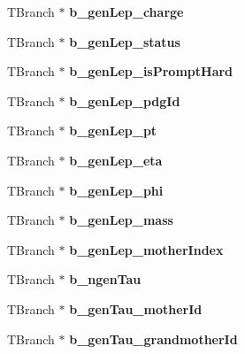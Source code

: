 \begin{DoxyCompactItemize}
T\+Branch $\ast$ {\bfseries b\+\_\+gen\+Lep\+\_\+charge}
\item 
\hypertarget{classMiniTree_a576df50212d621702f6d9ecfdaa6e6f2}{}\label{classMiniTree_a576df50212d621702f6d9ecfdaa6e6f2} 
T\+Branch $\ast$ {\bfseries b\+\_\+gen\+Lep\+\_\+status}
\item 
\hypertarget{classMiniTree_a61502a26cf655a8148547f975661ac36}{}\label{classMiniTree_a61502a26cf655a8148547f975661ac36} 
T\+Branch $\ast$ {\bfseries b\+\_\+gen\+Lep\+\_\+is\+Prompt\+Hard}
\item 
\hypertarget{classMiniTree_aebd575344b9b24a58ee00bd4f8bb2f8b}{}\label{classMiniTree_aebd575344b9b24a58ee00bd4f8bb2f8b} 
T\+Branch $\ast$ {\bfseries b\+\_\+gen\+Lep\+\_\+pdg\+Id}
\item 
\hypertarget{classMiniTree_a7c33791838941e782e6c7059634a1b1a}{}\label{classMiniTree_a7c33791838941e782e6c7059634a1b1a} 
T\+Branch $\ast$ {\bfseries b\+\_\+gen\+Lep\+\_\+pt}
\item 
\hypertarget{classMiniTree_a9fbb54404c9680bcb071a15d5f2c19b6}{}\label{classMiniTree_a9fbb54404c9680bcb071a15d5f2c19b6} 
T\+Branch $\ast$ {\bfseries b\+\_\+gen\+Lep\+\_\+eta}
\item 
\hypertarget{classMiniTree_a4b96f70b2d96fdfb5286c4ee5aa53738}{}\label{classMiniTree_a4b96f70b2d96fdfb5286c4ee5aa53738} 
T\+Branch $\ast$ {\bfseries b\+\_\+gen\+Lep\+\_\+phi}
\item 
\hypertarget{classMiniTree_a8b7185dde7d0a31268b01ba40ebada0a}{}\label{classMiniTree_a8b7185dde7d0a31268b01ba40ebada0a} 
T\+Branch $\ast$ {\bfseries b\+\_\+gen\+Lep\+\_\+mass}
\item 
\hypertarget{classMiniTree_af42b694f60b4e3cf844a2578b45474a8}{}\label{classMiniTree_af42b694f60b4e3cf844a2578b45474a8} 
T\+Branch $\ast$ {\bfseries b\+\_\+gen\+Lep\+\_\+mother\+Index}
\item 
\hypertarget{classMiniTree_a381cfc714f5f93999efc17e4d2b53666}{}\label{classMiniTree_a381cfc714f5f93999efc17e4d2b53666} 
T\+Branch $\ast$ {\bfseries b\+\_\+ngen\+Tau}
\item 
\hypertarget{classMiniTree_a7372713830345ce487cf5a9f04a820e0}{}\label{classMiniTree_a7372713830345ce487cf5a9f04a820e0} 
T\+Branch $\ast$ {\bfseries b\+\_\+gen\+Tau\+\_\+mother\+Id}
\item 
\hypertarget{classMiniTree_aae46990c1ce8520838484218df2f1005}{}\label{classMiniTree_aae46990c1ce8520838484218df2f1005} 
T\+Branch $\ast$ {\bfseries b\+\_\+gen\+Tau\+\_\+grandmother\+Id}
\item 
\hypertarget{classMiniTree_a3767c5d546da031aed60a83b45042de7}{}\label{classMiniTree_a3767c5d546da031aed60a83b45042de7} 

\end{DoxyCompactItemize}
